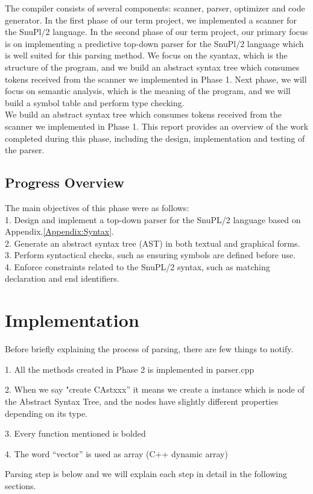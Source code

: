 \documentclass[12pt]{article}
\begin{document}
The compiler consists of several components: scanner, parser, optimizer and code generator\cite{Textbook_Compiler}.
In the first phase of our term project, we implemented a scanner for the SnuPl/2 language.
In the second phase of our term project, our primary focus is on implementing a predictive top-down parser\cite{Egger_Lecture_Note} for the SnuPl/2 language which is well suited for this parsing method.
We focus on the syantax, which is the structure of the program, and we build an abstract syntax tree which consumes tokens received from the scanner we implemented in Phase 1.
Next phase, we will focus on semantic analysis, which is the meaning of the program, and we will build a symbol table and perform type checking.\\

We build an abstract syntax tree which consumes tokens received from the scanner we implemented in Phase 1.
This report provides an overview of the work completed during this phase, including the design, implementation and testing of the parser.


\subsection{Progress Overview}
The main objectives of this phase were as follows:\\
1. Design and implement a top-down parser for the SnuPL/2 language based on Appendix.\ref*{Appendix:Syntax}. \\
2. Generate an abstract syntax tree (AST) in both textual and graphical forms. \\
3. Perform syntactical checks, such as ensuring symbols are defined before use. \\
4. Enforce constraints related to the SnuPL/2 syntax, such as matching declaration and end identifiers. \\

\section{Implementation}
\begin{MyIndentedList}
    \item Before briefly explaining the process of parsing, there are few things to notify.
    \begin{MyIndentedList}
        \item 1.	All the methods created in Phase 2 is implemented in parser.cpp
        \item 2. 	When we say "create CAstxxx” it means we create a instance which is node of the Abstract Syntax Tree, and the nodes have slightly different properties depending on its type.
        \item 3.	Every function mentioned is bolded
        \item 4. The word “vector” is used as array (C++ dynamic array)
    \end{MyIndentedList}
\end{MyIndentedList}
Parsing step is below and we will explain each step in detail in the following sections.
\end{document}
